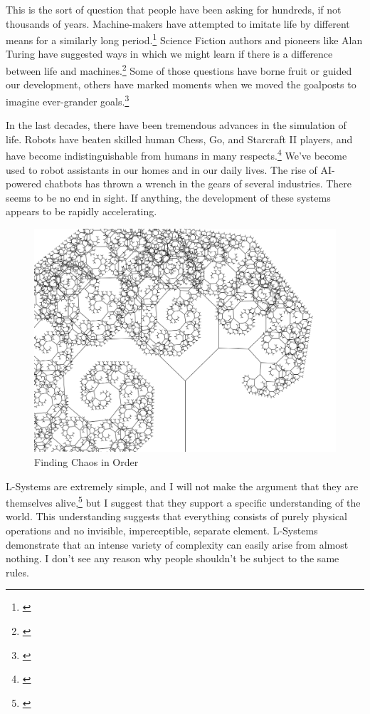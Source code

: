 \documentclass[12pt,twoside]{reedthesis}
\begin{document}
	This is the sort of question that people have been asking for hundreds, if not thousands of years. Machine-makers have attempted to imitate life by different means for a similarly long period.\footnote{\cite{riskin2016}} Science Fiction authors and pioneers like Alan Turing have suggested ways in which we might learn if there is a difference between life and machines.\footnote{\cite{turing1936}} Some of those questions have borne fruit or guided our development, others have marked moments when we moved the goalposts to imagine ever-grander goals.\footnote{\cite{theory2004}}
	
	In the last decades, there have been tremendous advances in the simulation of life. Robots have beaten skilled human Chess, Go, and Starcraft II players, and have become indistinguishable from humans in many respects.\footnote{\cite{gamerAI2019}} We've become used to robot assistants in our homes and in our daily lives. The rise of AI-powered chatbots has thrown a wrench in the gears of several industries. There seems to be no end in sight. If anything, the development of these systems appears to be rapidly accelerating.
	
	\begin{figure}[h]
	\centering
	\includegraphics[width=0.6\linewidth]{Images/TiltedTree2}
	\caption{Finding Chaos in Order}
	\label{TiltedTree}
	\end{figure}
	
	L-Systems are extremely simple, and I will not make the argument that they are themselves alive,\footnote{\cite{theory2004}} but I suggest that they support a specific understanding of the world. This understanding suggests that everything consists of purely physical operations and no invisible, imperceptible, separate element. L-Systems demonstrate that an intense variety of complexity can easily arise from almost nothing. I don't see any reason why people shouldn't be subject to the same rules.
\end{document}
